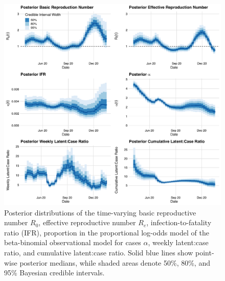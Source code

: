 \begin{figure}[htbp]
    \centering
    \includegraphics[width=1.0\columnwidth]{main_posterior_results_plot.pdf}
    \caption{Posterior distributions of the time-varying basic reproductive number $R_0$, effective reproductive number $R_e$, infection-to-fatality ratio (IFR), proportion in the proportional log-odds model of the beta-binomial observational model for cases $\alpha$, weekly latent:case ratio, and cumulative latent:case ratio.
    Solid blue lines show point-wise posterior medians, while shaded areas denote 50\%, 80\%, and 95\% Bayesian credible intervals.}
    \label{ch_4:fig:main_posterior_results_plot}
\end{figure}

